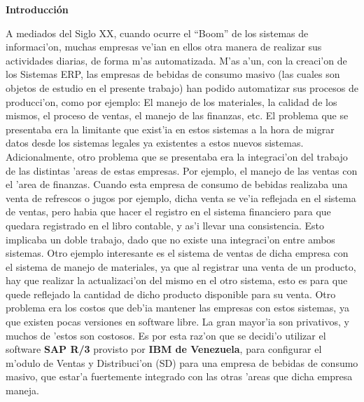 
\begin{center}
	{\bf Introducci\'on} \label{chap:intro}
\end{center}

\label{sect:motivacion}

	A mediados del Siglo XX, cuando ocurre el ``Boom'' de los sistemas de informaci'on, muchas empresas ve'ian en ellos otra manera de realizar sus actividades diarias, de forma m'as automatizada. M'as a'un, con la creaci'on de los Sistemas ERP, las empresas de bebidas de consumo masivo (las cuales son objetos de estudio en el presente trabajo) han podido automatizar sus procesos de producci'on, como por ejemplo: El manejo de los materiales, la calidad de los mismos, el proceso de ventas, el manejo de las finanzas, etc. El problema que se presentaba era la limitante que exist'ia en estos sistemas a la hora de migrar datos desde los sistemas legales ya existentes a estos nuevos sistemas.
\newline
\newline
\indent Adicionalmente, otro problema que se presentaba era la integraci'on del trabajo de las distintas 'areas de estas empresas. Por ejemplo, el manejo de las ventas con el 'area de finanzas. Cuando esta empresa de consumo de bebidas realizaba una venta de refrescos o jugos por ejemplo, dicha venta se ve'ia reflejada en el sistema de ventas, pero habia que hacer el registro en el sistema financiero para que quedara registrado en el libro contable, y as'i llevar una consistencia. Esto implicaba un doble trabajo, dado que no existe una integraci'on entre ambos sistemas. Otro ejemplo interesante es el sistema de ventas de dicha empresa con el sistema de manejo de materiales, ya que al registrar una venta de un producto, hay que realizar la actualizaci'on del mismo en el otro sistema, esto es para que quede reflejado la cantidad de dicho producto disponible para su venta.
\newline
\newline
\indent Otro problema era los costos que deb'ia mantener las empresas con estos sistemas, ya que existen pocas versiones en software libre. La gran mayor'ia son privativos, y muchos de 'estos son costosos.
\newline
\newline
\indent Es por esta raz'on que se decidi'o utilizar el software \textbf{SAP R/3} provisto por \textbf{IBM de Venezuela}, para configurar el m'odulo de Ventas y Distribuci'on (SD) para una empresa de bebidas de consumo masivo, que estar'a fuertemente integrado con las otras 'areas que dicha empresa maneja.

